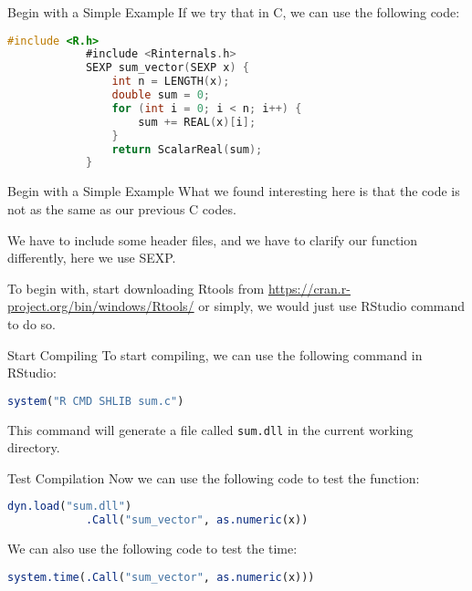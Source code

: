 \documentclass[aspectratio=169]{beamer}
\begin{document}
    \begin{frame}[fragile]{Begin with a Simple Example}
        If we try that in C, we can use the following code:\par
        \begin{lstlisting}[language=C]
            #include <R.h>
            #include <Rinternals.h>
            SEXP sum_vector(SEXP x) {
                int n = LENGTH(x);
                double sum = 0;
                for (int i = 0; i < n; i++) {
                    sum += REAL(x)[i];
                }
                return ScalarReal(sum);
            }
        \end{lstlisting}
    \end{frame}

    \begin{frame}{Begin with a Simple Example}
        What we found interesting here is that the code is not as the same as our previous C codes.\par
        We have to include some header files, and we have to clarify our function differently, here we use SEXP.\par
        To begin with, start downloading Rtools from \url{https://cran.r-project.org/bin/windows/Rtools/} or simply, we would just use RStudio command to do so.\par
    \end{frame}

    \begin{frame}[fragile]{Start Compiling}
        To start compiling, we can use the following command in RStudio:\par
        \begin{lstlisting}[language=R]
            system("R CMD SHLIB sum.c")
        \end{lstlisting}
        This command will generate a file called \texttt{sum.dll} in the current working directory.\par
    \end{frame}

    \begin{frame}[fragile]{Test Compilation}
        Now we can use the following code to test the function:\par
        \begin{lstlisting}[language=R]
            dyn.load("sum.dll")
            .Call("sum_vector", as.numeric(x))
        \end{lstlisting}
        We can also use the following code to test the time:\par
        \begin{lstlisting}[language=R]
            system.time(.Call("sum_vector", as.numeric(x)))
        \end{lstlisting}
    \end{frame}
\end{document}
